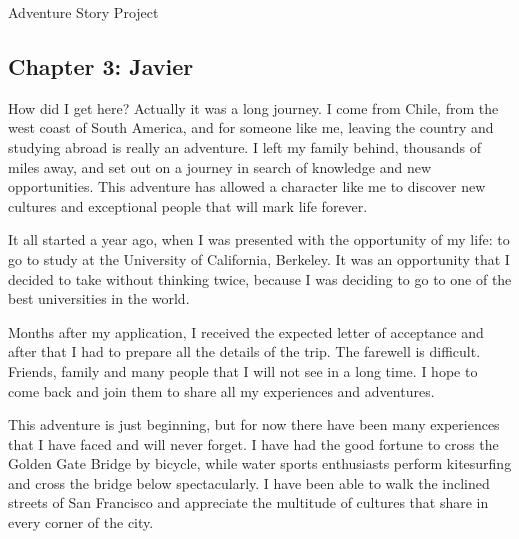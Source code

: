 \documentclass{article}
\begin{document}
\Huge Adventure Story Project

\normalsize

\subsection*{Chapter 3: Javier}

How did I get here? Actually it was a long journey. I come from Chile, from the west coast of South America, and for someone like me, leaving the country and studying abroad is really an adventure. I left my family behind, thousands of miles away, and set out on a journey in search of knowledge and new opportunities. This adventure has allowed a character like me to discover new cultures and exceptional people that will mark life forever.

It all started a year ago, when I was presented with the opportunity of my life: to go to study at the University of California, Berkeley. It was an opportunity that I decided to take without thinking twice, because I was deciding to go to one of the best universities in the world.

Months after my application, I received the expected letter of acceptance and after that I had to prepare all the details of the trip. The farewell is difficult. Friends, family and many people that I will not see in a long time. I hope to come back and join them to share all my experiences and adventures.

This adventure is just beginning, but for now there have been many experiences that I have faced and will never forget. I have had the good fortune to cross the Golden Gate Bridge by bicycle, while water sports enthusiasts perform kitesurfing and cross the bridge below spectacularly. I have been able to walk the inclined streets of San Francisco and appreciate the multitude of cultures that share in every corner of the city.
\end{document}
